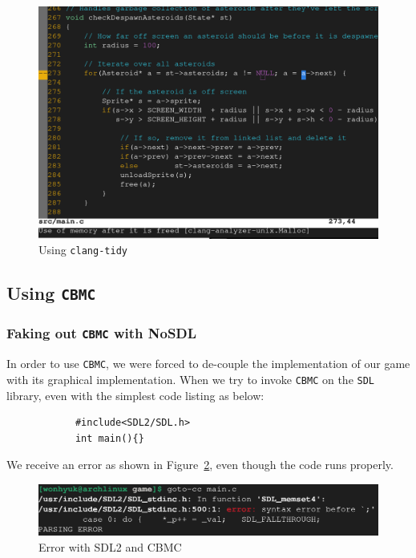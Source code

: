\documentclass{article}
\newcommand{\cbmc}{\texttt{CBMC}}
\newcommand{\sdl}{\texttt{SDL}}
\begin{document}
        \begin{figure}[h!]
            \includegraphics[width=\linewidth]{clang-tidy.png}
            \caption{Using \texttt{clang-tidy}}
            \label{fig:clang-tidy}
        \end{figure}

    \subsection{Using \cbmc{}}

        \subsubsection{Faking out \cbmc{} with NoSDL}

            In order to use \cbmc{}, we were forced to de-couple the
            implementation of our game with its graphical implementation.
            When we try to invoke \cbmc{} on the \sdl{} library, even with
            the simplest code listing as below:

            \begin{verbatim}
            #include<SDL2/SDL.h>
            int main(){}
            \end{verbatim}

            We receive an error as shown in Figure~\ref{fig:cbmc-sdl}, even
            though the code runs properly.

            \begin{figure}[h!]
                \includegraphics[width=\linewidth]{cbmc-sdl.png}
                \caption{Error with SDL2 and CBMC}
                \label{fig:cbmc-sdl}
            \end{figure}
\end{document}
